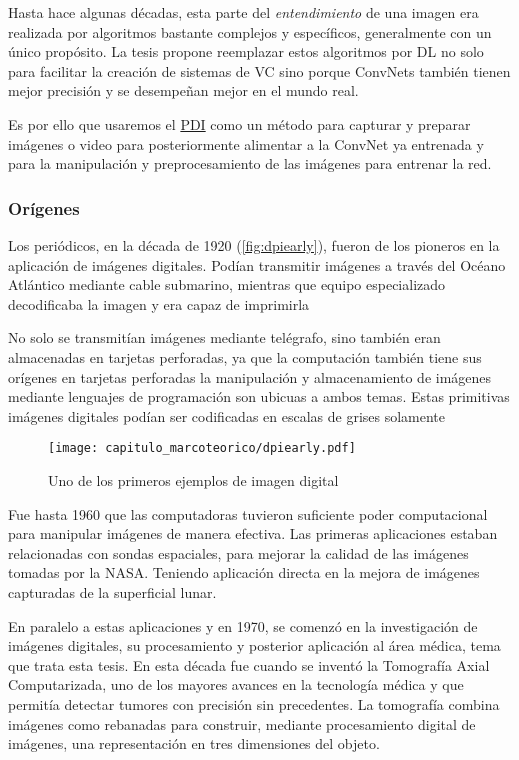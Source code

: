 Hasta hace algunas décadas, esta parte del \emph{entendimiento} de una imagen
era realizada por algoritmos bastante complejos y específicos, generalmente con
un único propósito. La tesis propone reemplazar estos algoritmos por DL no solo
para facilitar la creación de sistemas de VC sino porque ConvNets también tienen
mejor precisión y se desempeñan mejor en el mundo real. 

Es por ello que usaremos el \hyperlink{abbr}{PDI} como un método para capturar y preparar imágenes
o video para posteriormente alimentar a la ConvNet ya entrenada y para la
manipulación y preprocesamiento de las imágenes para entrenar la red. 

\subsubsection{Orígenes}

Los periódicos, en la década de 1920 (\autoref{fig:dpiearly}), fueron de los
pioneros en la aplicación de imágenes digitales. Podían transmitir imágenes a
través del Océano Atlántico mediante cable submarino, mientras que equipo
especializado decodificaba la imagen y era capaz de imprimirla

No solo se transmitían imágenes mediante telégrafo, sino también eran
almacenadas en tarjetas perforadas, ya que la computación también tiene sus
orígenes en tarjetas perforadas la manipulación y almacenamiento de imágenes
mediante lenguajes de programación son ubicuas a ambos temas. Estas primitivas
imágenes digitales podían ser codificadas en escalas de grises solamente

\begin{figure}[H]
    \centering
    \texttt{[image: capitulo\_marcoteorico/dpiearly.pdf]}
    \caption{Uno de los primeros ejemplos de imagen digital}\label{fig:dpiearly}
\end{figure}

Fue hasta 1960 que las computadoras tuvieron suficiente poder computacional para
manipular imágenes de manera efectiva. Las primeras aplicaciones estaban
relacionadas con sondas espaciales, para mejorar la calidad de las imágenes
tomadas por la NASA. Teniendo aplicación directa en la mejora de imágenes
capturadas de la superficial lunar.

En paralelo a estas aplicaciones y en 1970, se comenzó en la investigación de
imágenes digitales, su procesamiento y posterior aplicación al área médica, tema
que trata esta tesis. En esta década fue cuando se inventó la Tomografía Axial
Computarizada, uno de los mayores avances en la tecnología médica y que permitía
detectar tumores con precisión sin precedentes. La tomografía combina imágenes
como rebanadas para construir, mediante procesamiento digital de imágenes, una
representación en tres dimensiones del objeto.

